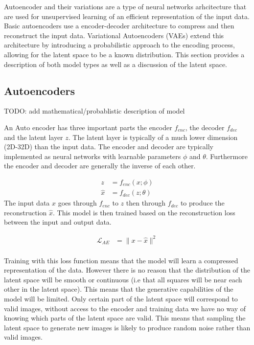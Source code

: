 \documentclass[conference,a4paper]{IEEEtran}
\begin{document}
Autoencoder and their variations are a type of neural networks arhcitecture that are used for unsupervised learning of an efficient representation of the input data. Basic autoencoders use a encoder-decoder architecture to compress and then reconstruct the input data. Variational Autoencoders (VAEs) extend this architecture by introducing a probabilistic approach to the encoding process, allowing for the latent space to be a known distribution. This section provides a description of both model types as well as a discussion of the latent space.

\subsection{Autoencoders}

TODO: add mathematical/probablistic description of model

An Auto encoder has three important parts the encoder $f_{enc}$, the decoder $f_{dec}$ and the latent layer $z$. The latent layer is typically of a much lower dimension (2D-32D) than the input data. The encoder and decoder are typically implemented as neural networks with learnable parameters $\phi$ and $\theta$. Furthermore the encoder and decoder are generally the inverse of each other.

\begin{align}
z &= f_{enc}(x; \phi)\\
\hat{x} &= f_{dec}(z; \theta)
\end{align}
The input data $x$ goes through $f_{enc}$ to $z$ then through $f_{dec}$ to produce the reconstruction $\hat{x}$. This model is then trained based on the reconstruction loss between the input and output data.

\begin{align}
\mathcal{L}_{AE} &= \| x - \hat{x} \|^2\\
\end{align}

Training with this loss function means that the model will learn a compressed representation of the data. However there is no reason that the distribution of the latent space will be smooth or continuous (i.e that all squares will be near each other in the latent space). This means that the generative capabilities of the model will be limited. Only certain part of the latent space will correspond to valid images, without access to the encoder and training data we have no way of knowing which parts of the latent space are valid. This means that sampling the latent space to generate new images is likely to produce random noise rather than valid images.
\end{document}
